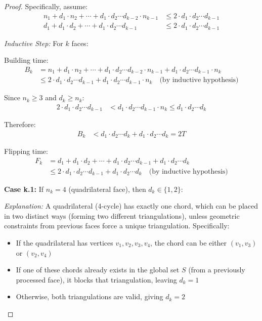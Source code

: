 \documentclass[12pt,a4paper]{article}
\theoremstyle{definition}
\theoremstyle{remark}
\begin{document}
\begin{proof}
Specifically, assume:
\begin{align}
n_1 + d_1 \cdot n_2 + \cdots + d_1 \cdot d_2 \cdots d_{k-2} \cdot n_{k-1} &\leq 2 \cdot d_1 \cdot d_2 \cdots d_{k-1} \\
d_1 + d_1 \cdot d_2 + \cdots + d_1 \cdot d_2 \cdots d_{k-1} &\leq 2 \cdot d_1 \cdot d_2 \cdots d_{k-1}
\end{align}

\textit{Inductive Step:} For $k$ faces:

Building time:
\begin{align}
B_k &= n_1 + d_1 \cdot n_2 + \cdots + d_1 \cdot d_2 \cdots d_{k-2} \cdot n_{k-1} + d_1 \cdot d_2 \cdots d_{k-1} \cdot n_k \\
&\leq 2 \cdot d_1 \cdot d_2 \cdots d_{k-1} + d_1 \cdot d_2 \cdots d_{k-1} \cdot n_k \quad \text{(by inductive hypothesis)}
\end{align}

Since $n_k \geq 3$ and $d_k \geq n_k$:
\begin{align}
2 \cdot d_1 \cdot d_2 \cdots d_{k-1} &< d_1 \cdot d_2 \cdots d_{k-1} \cdot n_k \leq d_1 \cdot d_2 \cdots d_k
\end{align}

Therefore:
\begin{align}
B_k &< d_1 \cdot d_2 \cdots d_k + d_1 \cdot d_2 \cdots d_k = 2T
\end{align}

Flipping time:
\begin{align}
F_k &= d_1 + d_1 \cdot d_2 + \cdots + d_1 \cdot d_2 \cdots d_{k-1} + d_1 \cdot d_2 \cdots d_k \\
&\leq 2 \cdot d_1 \cdot d_2 \cdots d_{k-1} + d_1 \cdot d_2 \cdots d_k \quad \text{(by inductive hypothesis)}
\end{align}

\textbf{Case k.1:} If $n_k = 4$ (quadrilateral face), then $d_k \in \{1, 2\}$:

\textit{Explanation:} A quadrilateral (4-cycle) has exactly one chord, which can be placed in two distinct ways (forming two different triangulations), unless geometric constraints from previous faces force a unique triangulation. Specifically:
\begin{itemize}
    \item If the quadrilateral has vertices $v_1, v_2, v_3, v_4$, the chord can be either $(v_1, v_3)$ or $(v_2, v_4)$
    \item If one of these chords already exists in the global set $S$ (from a previously processed face), it blocks that triangulation, leaving $d_k = 1$
    \item Otherwise, both triangulations are valid, giving $d_k = 2$
\end{itemize}


\end{proof}
\end{document}
